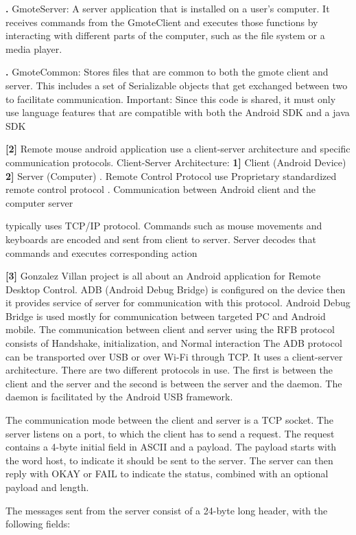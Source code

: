 \documentclass[12pt]{article}
\begin{document}
\textbf. GmoteServer: A server application that is installed on a user's computer. It
receives commands from the GmoteClient and executes those functions by
interacting with different parts of the computer, such as the file system or a
media player.

\textbf. GmoteCommon: Stores files that are common to both the gmote client and
server. This includes a set of Serializable objects that get exchanged between
two to facilitate communication. Important: Since this code is shared, it must
only use language features that are compatible with both the Android SDK
and a java SDK\par
\clearpage

\textbf{[2]} Remote mouse android application use a client-server architecture and specific
communication protocols.
Client-Server Architecture: 
	\textbf{1]} Client (Android Device)
	\textbf{2]} Server (Computer)
. Remote Control Protocol use Proprietary standardized remote control
protocol
. Communication between Android client and the computer server

typically uses TCP/IP protocol.
Commands such as mouse movements and keyboards are encoded and sent from client
to server. Server decodes that commands and executes corresponding action\par
\textbf{[3]} Gonzalez Villan project is all about an Android application for Remote Desktop
Control. ADB (Android Debug Bridge) is configured on the device then it provides service
of server for communication with this protocol. Android Debug Bridge is used mostly for
communication between targeted PC and Android mobile. The communication between
client and server using the RFB protocol consists of Handshake, initialization, and Normal
interaction
The ADB protocol can be transported over USB or over Wi-Fi through TCP. It uses
a client-server architecture. There are two different protocols in use. The first is between
the client and the server and the second is between the server and the daemon. The
daemon is facilitated by the Android USB framework.

The communication mode between the client and server is a TCP socket. The server
listens on a port, to which the client has to send a request. The request contains a 4-byte
initial field in ASCII and a payload. The payload starts with the word host, to indicate it
should be sent to the server. The server can then reply with OKAY or FAIL to indicate the
status, combined with an optional payload and length.
\clearpage
{}
The messages sent from the server consist of a 24-byte long header, with the following
fields:
\end{document}
